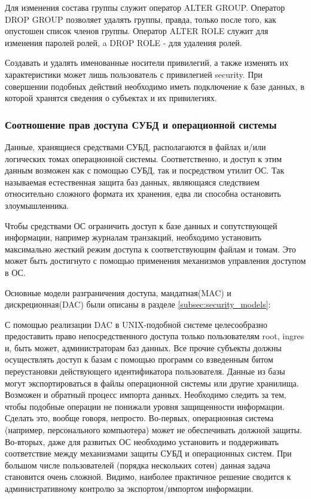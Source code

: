 Для изменения состава группы служит оператор ALTER GROUP. Оператор DROP GROUP позволяет удалять
группы, правда, только после того, как опустошен список членов группы. Оператор ALTER ROLE служит
для изменения паролей ролей, a DROP ROLE - для удаления ролей.

Создавать и удалять именованные носители привилегий, а также изменять их характеристики может лишь
пользователь с привилегией security. При совершении подобных действий необходимо иметь подключение
к базе данных, в которой хранятся сведения о субъектах и их привилегиях.


\subsubsection{Соотношение прав доступа СУБД и операционной системы}

Данные, хранящиеся средствами СУБД, располагаются в файлах и/или логических томах операционной
системы. Соответственно, и доступ к этим данным возможен как с помощью СУБД, так и посредством
утилит ОС. Так называемая естественная защита баз данных, являющаяся следствием относительно
сложного формата их хранения, едва ли способна остановить злоумышленника.

Чтобы средствами ОС ограничить доступ к базе данных и сопутствующей информации,
например журналам транзакций, необходимо установить максимально жесткий режим доступа к
соответствующим файлам и томам. Это может быть достигнуто с помощью применения механизмов
управления доступом в ОС.

Основные модели разграничения доступа, мандатная(MAC) и дискреционная(DAC) были описаны в разделе \ref{subsec:security_models}:

С помощью реализации DAC в UNIX-подобной системе целесообразно предоставить право непосредственного доступа
только пользователям root, ingres и, быть может, администраторам баз данных. Все прочие
субъекты должны осуществлять доступ к базам с помощью программ со взведенным битом переустановки
действующего идентификатора пользователя.
Данные из базы могут экспортироваться в файлы операционной системы или другие хранилища. Возможен и
обратный процесс импорта данных. Необходимо следить за тем, чтобы подобные операции не понижали
уровня защищенности информации. Сделать это, вообще говоря, непросто. Во-первых, операционная
система (например, персонального компьютера) может не обеспечивать должной защиты. Во-вторых, даже
для развитых ОС необходимо установить и поддерживать соответствие между механизмами защиты СУБД и
операционных систем. При большом числе пользователей (порядка нескольких сотен) данная задача
становится очень сложной. Видимо, наиболее практичное решение сводится к административному контролю
за экспортом/импортом информации.

